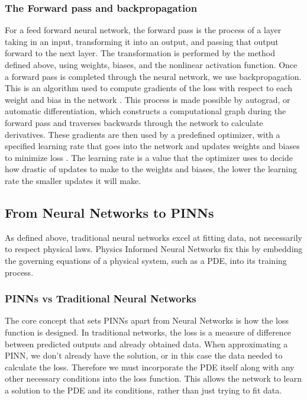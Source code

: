 \documentclass[12pt, reqno]{amsart}
\begin{document}
\subsubsection{The Forward pass and backpropagation}
For a feed forward neural network, the forward pass is the process of a layer taking in an input, transforming it into an output, and passing that output forward to the next layer. The transformation is performed by the method defined above, using weights, biases, and the nonlinear activation function. Once a forward pass is completed through the neural network, we use backpropagation. This is an algorithm used to compute gradients of the loss with respect to each weight and bias in the network \cite{4}. This process is made possible by autograd, or automatic differentiation, which constructs a computational graph during the forward pass and traverses backwards through the network to calculate derivatives. These gradients are then used by a predefined optimizer, with a specified learning rate that goes into the network and updates weights and biases to minimize loss \cite{4}. The learning rate is a value that the optimizer uses to decide how drastic of updates to make to the weights and biases, the lower the learning rate the smaller updates it will make.
\subsection{From Neural Networks to PINNs}
As defined above, traditional neural networks excel at fitting data, not necessarily to respect physical laws. Physics Informed Neural Networks fix this by embedding the governing equations of a physical system, such as a PDE, into its training process.
\subsubsection{PINNs vs Traditional Neural Networks}
The core concept that sets PINNs apart from Neural Networks is how the loss function is designed. In traditional networks, the loss is a measure of difference between predicted outputs and already obtained data. When approximating a PINN, we don't already have the solution, or in this case the data needed to calculate the loss. Therefore we must incorporate the PDE itself along with any other necessary conditions into the loss function. This allows the network to learn a solution to the PDE and its conditions, rather than just trying to fit data.
\end{document}
